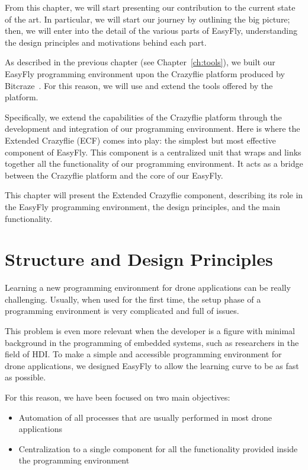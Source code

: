 From this chapter, we will start presenting our contribution to the current state of the art.
In particular, we will start our journey by outlining the big picture; then, we will enter into the detail of the various parts of EasyFly, understanding the design principles and motivations behind each part.

As described in the previous chapter (see Chapter~\ref{ch:tools}), we built our EasyFly programming environment upon the Crazyflie platform produced by Bitcraze~\cite{bitcraze}.
For this reason, we will use and extend the tools offered by the platform.

Specifically, we extend the capabilities of the Crazyflie platform through the development and integration of our programming environment.
Here is where the Extended Crazyflie (ECF) comes into play: the simplest but most effective component of EasyFly. 
This component is a centralized unit that wraps and links together all the functionality of our programming environment. 
It acts as a bridge between the Crazyflie platform and the core of our EasyFly.

This chapter will present the Extended Crazyflie component, describing its role in the EasyFly programming environment, the design principles, and the main functionality. 

\section{Structure and Design Principles}\label{sec:ecf_structure_design}

Learning a new programming environment for drone applications can be really challenging. 
Usually, when used for the first time, the setup phase of a programming environment is very complicated and full of issues.

This problem is even more relevant when the developer is a figure with minimal background in the programming of embedded systems, such as researchers in the field of HDI.
To make a simple and accessible programming environment for drone applications, we designed EasyFly to allow the learning curve to be as fast as possible.

\pagebreak%

For this reason, we have been focused on two main objectives:
\begin{itemize}
    \item Automation of all processes that are usually performed in most drone applications
    \item Centralization to a single component for all the functionality provided inside the programming environment
\end{itemize}

